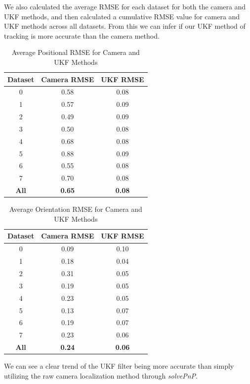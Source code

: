 \documentclass{article}
\begin{document}
We also calculated the average RMSE for each dataset for both the camera and UKF methods, and then calculated a cumulative RMSE value for camera and UKF methods across all datasets. From this we can infer if our UKF method of tracking is more accurate than the camera method.

\begin{table}
    \centering
    \begin{tabular}{|c|c|c|}
        \hline
        \textbf{Dataset} & \textbf{Camera RMSE} & \textbf{UKF RMSE} \\
        \hline
        0                & 0.58                 & 0.08              \\
        1                & 0.57                 & 0.09              \\
        2                & 0.49                 & 0.09              \\
        3                & 0.50                 & 0.08              \\
        4                & 0.68                 & 0.08              \\
        5                & 0.88                 & 0.09              \\
        6                & 0.55                 & 0.08              \\
        7                & 0.70                 & 0.08              \\
        \textbf{All}     & \textbf{0.65}        & \textbf{0.08}     \\
        \hline
    \end{tabular}
    \caption{Average Positional RMSE for Camera and UKF Methods}
\end{table}

\begin{table}
    \centering
    \begin{tabular}{|c|c|c|}
        \hline
        \textbf{Dataset} & \textbf{Camera RMSE} & \textbf{UKF RMSE} \\
        \hline
        0                & 0.09                 & 0.10              \\
        1                & 0.18                 & 0.04              \\
        2                & 0.31                 & 0.05              \\
        3                & 0.19                 & 0.05              \\
        4                & 0.23                 & 0.05              \\
        5                & 0.13                 & 0.07              \\
        6                & 0.19                 & 0.07              \\
        7                & 0.23                 & 0.06              \\
        \textbf{All}     & \textbf{0.24}        & \textbf{0.06}     \\
        \hline
    \end{tabular}
    \caption{Average Orientation RMSE for Camera and UKF Methods}
\end{table}

We can see a clear trend of the UKF filter being more accurate than simply utilizing the raw camera localization method through \textit{solvePnP}.
\end{document}
